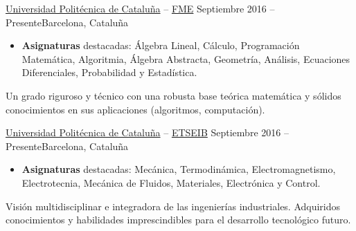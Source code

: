 \documentclass[10pt, a4paper, ragged2e]{../altacv}
\begin{document}

\begin{fullwidth}
  \makecvheader
\end{fullwidth}

\medskip
{}

{\href{https://upc.edu}{Universidad Politécnica de Cataluña} --
  \href{https://fme.upc.edu}{FME}}
{Septiembre 2016 -- Presente}{Barcelona, Cataluña}
\begin{itemize}
  \item \textbf{Asignaturas} destacadas: Álgebra Lineal, Cálculo, Programación
  Matemática, Algoritmia, Álgebra Abstracta, Geometría, Análisis, Ecuaciones
  Diferenciales, Probabilidad y Estadística.
\end{itemize}
Un grado riguroso y técnico con una robusta base teórica matemática y sólidos
conocimientos en sus aplicaciones (algoritmos, computación).

\divider

{\href{https://upc.edu}{Universidad Politécnica de Cataluña} --
\href{https://etseib.upc.edu}{ETSEIB}}
{Septiembre 2016 -- Presente}{Barcelona, Cataluña}
\begin{itemize}
  \item \textbf{Asignaturas} destacadas: Mecánica, Termodinámica,
  Electromagnetismo, Electrotecnia, Mecánica de Fluidos, Materiales,
  Electrónica y Control.
\end{itemize}
Visión multidisciplinar e integradora de las ingenierías industriales.
Adquiridos conocimientos y habilidades imprescindibles para el desarrollo
tecnológico futuro.
\end{document}
